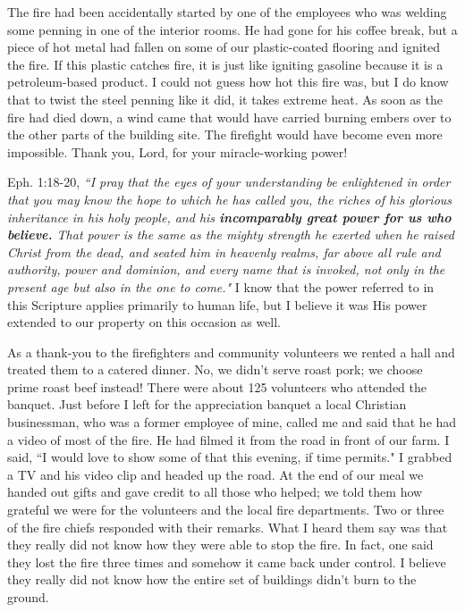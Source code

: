 \documentclass[oneside]{book}
\begin{document}
The fire had been accidentally started by one of the employees who was welding some penning in one of the interior rooms. He had gone for his coffee break, but a piece of hot metal had fallen on some of our plastic-coated flooring and ignited the fire. If this plastic catches fire, it is just like igniting gasoline because it is a petroleum-based product. I could not guess how hot this fire was, but I do know that to twist the steel penning like it did, it takes extreme heat. As soon as the fire had died down, a wind came that would have carried burning embers over to the other parts of the building site. The firefight would have become even more impossible. Thank you, Lord, for your miracle-working power! 

Eph. 1:18-20, \textit{``I pray that the eyes of your understanding be enlightened in order that you may know the hope to which he has called you, the riches of his glorious inheritance in his holy people, and his \textbf{incomparably great power for us who believe.} That power is the same as the mighty strength he exerted when he raised Christ from the dead, and seated him in heavenly realms, far above all rule and authority, power and dominion, and every name that is invoked, not only in the present age but also in the one to come."} I know that the power referred to in this Scripture applies primarily to human life, but I believe it was His power extended to our property on this occasion as well. 

As a thank-you to the firefighters and community volunteers we rented a hall and treated them to a catered dinner. No, we didn't serve roast pork; we choose prime roast beef instead! There were about 125 volunteers who attended the banquet. Just before I left for the appreciation banquet a local Christian businessman, who was a former employee of mine, called me and said that he had a video of most of the fire. He had filmed it from the road in front of our farm. I said, ``I would love to show some of that this evening, if time permits." I grabbed a TV and his video clip and headed up the road. At the end of our meal we handed out gifts and gave credit to all those who helped; we told them how grateful we were for the volunteers and the local fire departments. Two or three of the fire chiefs responded with their remarks. What I heard them say was that they really did not know how they were able to stop the fire. In fact, one said they lost the fire three times and somehow it came back under control. I believe they really did not know how the entire set of buildings didn't burn to the ground.
\end{document}
